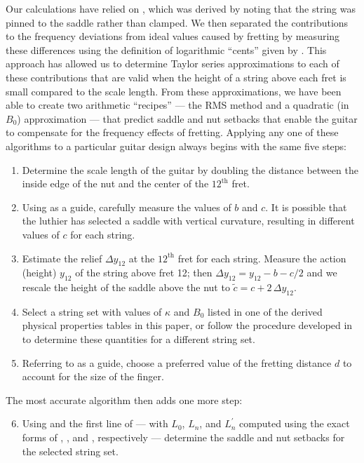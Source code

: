 Our calculations have relied on , which was derived by noting that the string was pinned to the saddle rather than clamped. We then separated the contributions to the frequency deviations from ideal values caused by fretting by measuring these differences using the definition of logarithmic ``cents'' given by . This approach has allowed us to determine Taylor series approximations to each of these contributions that are valid when the height of a string above each fret is small compared to the scale length. From these approximations, we have been able to create two arithmetic ``recipes'' --- the RMS method and a quadratic (in $B_0$) approximation --- that predict saddle and nut setbacks that enable the guitar to compensate for the frequency effects of fretting. Applying any one of these algorithms to a particular guitar design always begins with the same five steps:
\begin{enumerate}
    \item Determine the scale length of the guitar by doubling the distance between the inside edge of the nut and the center of the $12^\textrm{th}$ fret. 
    \item Using  as a guide, carefully measure the values of $b$ and $c$. It is possible that the luthier has selected a saddle with vertical curvature, resulting in different values of $c$ for each string.
    \item Estimate the relief $\Delta y_{12}$ at the $12^\textrm{th}$ fret for each string. Measure the action (height) $y_{12}$ of the string above fret 12; then $\Delta y_{12} = y_{12} - b - c/2$ and we rescale the height of the saddle above the nut to $\tilde{c} = c + 2\, \Delta y_{12}$.
    \item Select a string set with values of $\kappa$ and $B_0$ listed in one of the derived physical properties tables in this paper, or follow the procedure developed in  to determine these quantities for a different string set.
    \item Referring to  as a guide, choose a preferred value of the fretting distance $d$ to account for the size of the finger.
\end{enumerate}
The most accurate algorithm then adds one more step:
\begin{enumerate}
    \setcounter{enumi}{5}
    \item Using  and the first line of  --- with $L_0$, $L_n$, and $L_n^\prime$ computed using the exact forms of , , and , respectively --- determine the saddle and nut setbacks for the selected string set.
\end{enumerate}

